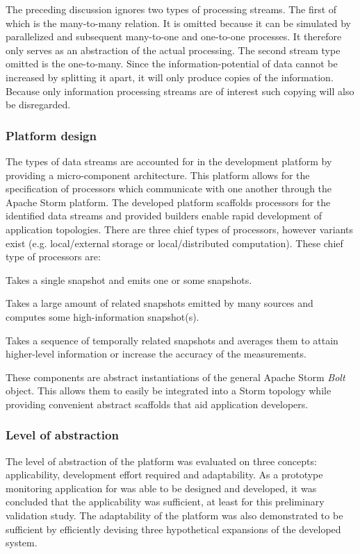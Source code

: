 The preceding discussion ignores two types of processing streams. The first of which is the many-to-many relation. It is omitted because it can be simulated by parallelized and subsequent many-to-one and one-to-one processes. It therefore only serves as an abstraction of the actual processing. The second stream type omitted is the one-to-many. Since the information-potential of data cannot be increased by splitting it apart, it will only produce copies of the information. Because only information processing streams are of interest such copying will also be disregarded. 

\subsubsection{Platform design}
The types of data streams are accounted for in the development platform by providing a micro-component architecture. This platform allows for the specification of processors which communicate with one another through the Apache Storm platform. The developed platform scaffolds processors for the identified data streams and provided builders enable rapid development of application topologies. There are three chief types of processors, however variants exist (e.g. local/external storage or local/distributed computation). These chief type of processors are:
\begin{description}[style=nextline]
\nospace
\item[SingleMessageProcessor]Takes a single snapshot and emits one or some snapshots.
\item[AccumulatorProcessor]Takes a large amount of related snapshots emitted by many sources and computes some high-information snapshot(s).
\item[BufferedProcessor]Takes a sequence of temporally related snapshots and averages them to attain higher-level information or increase the accuracy of the measurements.
\end{description}
These components are abstract instantiations of the general Apache Storm \emph{Bolt} object. This allows them to easily be integrated into a Storm topology while providing convenient abstract scaffolds that aid application developers.

\subsubsection{Level of abstraction}
The level of abstraction of the platform was evaluated on three concepts: applicability, development effort required and adaptability. As a prototype monitoring application for \idsystems was able to be designed and developed, it was concluded that the applicability was sufficient, at least for this preliminary validation study. The adaptability of the platform was also demonstrated to be sufficient by efficiently devising three hypothetical expansions of the developed system. 

